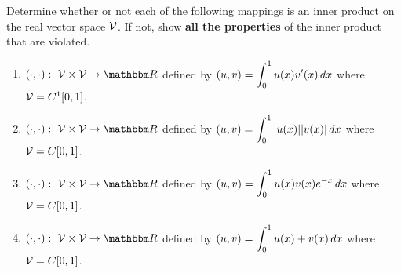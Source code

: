 Determine whether or not each of the following mappings is an inner product on the real vector space ${\cal V}$. If not, show \textbf{all the properties} of the inner product that are violated.

\begin{enumerate}
\item$\displaystyle{\ip{\cdot,\cdot}:\mbox{ }\CV\times\CV\rightarrow\R}$ defined by $\displaystyle{(u,v) = \int_0^1 u(x) v'(x)\, dx}$ where ${\cal V}=C^1[0,1]$.
\\
\item$\displaystyle{\ip{\cdot,\cdot}:\mbox{ }\CV\times\CV\rightarrow\R}$ defined by $\displaystyle{(u,v) = \int_0^1 |u(x)| |v(x)|\, dx}$ where ${\cal V}=C[0,1]$.
\\
\item$\displaystyle{\ip{\cdot,\cdot}:\mbox{ }\CV\times\CV\rightarrow\R}$ defined by $\displaystyle{(u,v) = \int_0^1 u(x) v(x) e^{-x}\, dx}$ where ${\cal V}=C[0,1]$.
\\
\item$\displaystyle{\ip{\cdot,\cdot}:\mbox{ }\CV\times\CV\rightarrow\R}$ defined by $\displaystyle{(u,v) = \int_0^1 u(x) + v(x)\, dx}$ where ${\cal V}=C[0,1]$.
\end{enumerate}



